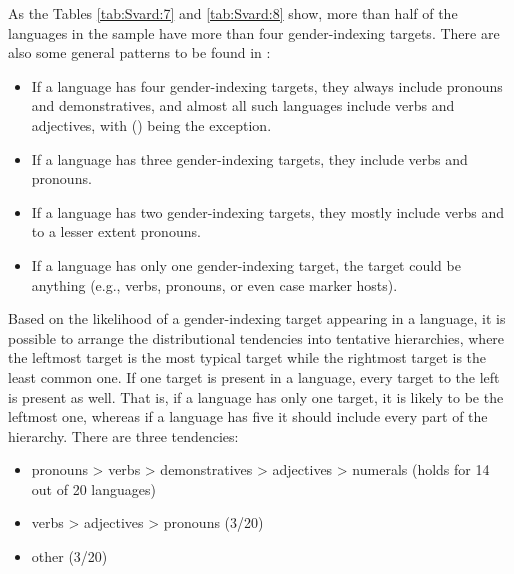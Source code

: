 \documentclass[output=collectionpaper]{langsci/langscibook}
\begin{document}

As the Tables \ref{tab:Svard:7} and \ref{tab:Svard:8} show, more than half of the languages in the sample have more than four gender-indexing targets. There are also some general patterns to be found in :

\begin{itemize}
\item If a language has four gender-indexing targets, they always include pronouns and demonstratives, and almost all such languages include verbs and adjectives, with  () being the exception.
\item If a language has three gender-indexing targets, they include verbs and pronouns.
\item If a language has two gender-indexing targets, they mostly include verbs and to a lesser extent pronouns.
\item If a language has only one gender-indexing target, the target could be anything (e.g., verbs, pronouns, or even case marker hosts).
\end{itemize}

Based on the likelihood of a gender-indexing target appearing in a language, it is possible to arrange the distributional tendencies into tentative hierarchies, where the leftmost target is the most typical target while the rightmost target is the least common one. If one target is present in a language, every target to the left is present as well. That is, if a language has only one target, it is likely to be the leftmost one, whereas if a language has five it should include every part of the hierarchy. There are three tendencies:

\begin{itemize}
\item pronouns > verbs > demonstratives > adjectives > numerals (holds for 14 out of 20 languages)
\item verbs > adjectives > pronouns (3/20)
\item other (3/20)
\end{itemize}
\end{document}
